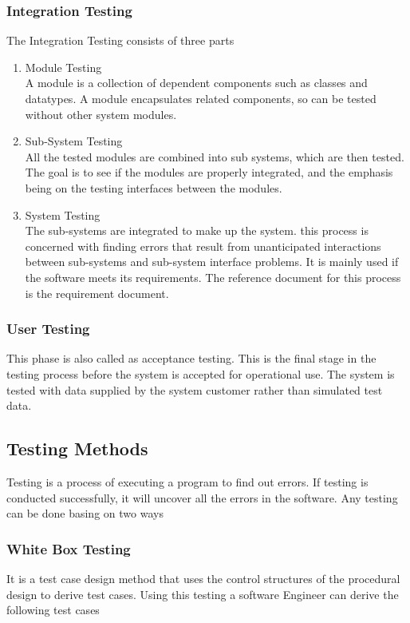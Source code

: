 \documentclass[a4paper,12pt]{article}
\begin{document}
\subsubsection{Integration Testing}
\hspace{18pt}The Integration Testing consists of three parts
\begin{enumerate}
 \item Module Testing\\
A module is a collection of dependent components such as classes and datatypes.
A module encapsulates related components, so can be tested without other system modules.
 \item Sub-System Testing\\
All the tested modules are combined into sub systems, which are then tested. The goal is to see if the modules are properly integrated, and the emphasis being on the testing interfaces between the modules.
 \item System Testing\\
The sub-systems are integrated to make up the system. this process is concerned with finding errors that result from unanticipated interactions between sub-systems and 
sub-system interface problems. It is mainly used if the software meets its requirements. The reference document for this process is the requirement document.
\end{enumerate}

\subsubsection{User Testing}
\hspace{18pt}This phase is also called as acceptance testing. This is the final stage in the testing process before the system is accepted for operational use. The system is tested with data supplied by the system customer rather than simulated test data.

\subsection{Testing Methods}
\hspace{18pt}Testing is a process of executing a program to find out errors. If testing is conducted successfully, it will uncover all the errors in the software. Any testing can be done basing on two ways

\subsubsection{White Box Testing}
\hspace{18pt}It is a test case design method that uses the control structures of the procedural design to derive test cases. Using this testing a software Engineer can derive the following test cases
\end{document}
